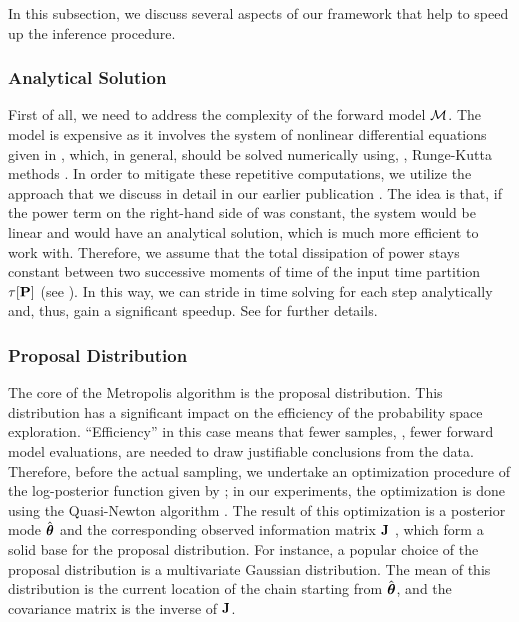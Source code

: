 In this subsection, we discuss several aspects of our framework that help to speed up the inference procedure.

\subsubsection{Analytical Solution} 
First of all, we need to address the complexity of the forward model $\model$. The model is expensive as it involves the system of nonlinear differential equations given in , which, in general, should be solved numerically using, \eg, Runge-Kutta methods \cite{press2007}. In order to mitigate these repetitive computations, we utilize the approach that we discuss in detail in our earlier publication \cite{ukhov2012}. The idea is that, if the power term on the right-hand side of  was constant, the system would be linear and would have an analytical solution, which is much more efficient to work with. Therefore, we assume that the total dissipation of power stays constant between two successive moments of time of the input time partition $\tau[\mathbf{P}]$ (see ). In this way, we can stride in time solving  for each step analytically and, thus, gain a significant speedup. See \cite{ukhov2012} for further details.

\subsubsection{Proposal Distribution} 
The core of the Metropolis algorithm is the proposal distribution. This distribution has a significant impact on the efficiency of the probability space exploration. ``Efficiency'' in this case means that fewer samples, \ie, fewer forward model evaluations, are needed to draw justifiable conclusions from the data. Therefore, before the actual sampling, we undertake an optimization procedure of the log-posterior function given by ; in our experiments, the optimization is done using the Quasi-Newton algorithm \cite{press2007}. The result of this optimization is a posterior mode $\hat{{\boldsymbol\theta}}$ and the corresponding observed information matrix $\mathbf{J}$ \cite{gelman2004}, which form a solid base for the proposal distribution. For instance, a popular choice of the proposal distribution is a multivariate Gaussian distribution. The mean of this distribution is the current location of the chain starting from $\hat{{\boldsymbol\theta}}$, and the covariance matrix is the inverse of $\mathbf{J}$.

